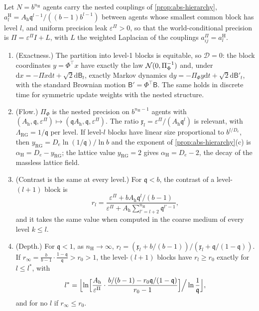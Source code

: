 \begin{theorem}\label{thm:ren-nested}
Let $N=b^{n_{\mathrm H}}$ agents carry the nested couplings of \cref{prop:abs-hierarchy}, $a^{\mathrm H}_l=A_{\mathrm h}\mathfrak q^{l-1}/((b-1)b^{l-1})$ between agents whose smallest common block has level $l$, and uniform precision leak $\varepsilon^\Pi>0$, so that the world-conditional precision is $\Pi=\varepsilon^\Pi I+L$, with $L$ the weighted Laplacian of the couplings $a^\Pi_{ij}=a^{\mathrm H}_l$.
\begin{enumerate}
\item[(a)] (Exactness.) The partition into level-1 blocks is equitable, so $\mathcal D=0$: the block coordinates $y=\Phi^\top x$ have exactly the law $\mathcal{N}(0,\Pi_\Phi^{-1})$ and, under $\mathrm dx=-\Pi x\mathrm dt+\sqrt2\mathrm d\mathsf B_t$, exactly Markov dynamics $\mathrm dy=-\Pi_\Phi y\mathrm dt+\sqrt2\mathrm d\mathsf B'_t$, with the standard Brownian motion $\mathsf B'=\Phi^\top\mathsf B$. The same holds in discrete time for symmetric update weights with the nested structure.
\item[(b)] (Flow.) $\Pi_\Phi$ is the nested precision on $b^{n_{\mathrm H}-1}$ agents with $(A_{\mathrm h},\mathfrak q,\varepsilon^\Pi)\mapsto(\mathfrak qA_{\mathrm h},\mathfrak q,\varepsilon^\Pi)$. The ratio $\mathfrak x_l=\varepsilon^\Pi/(A_{\mathrm h}\mathfrak q^l)$ is relevant, with $\Lambda_{\mathrm{RG}}=1/\mathfrak q$ per level. If level-$l$ blocks have linear size proportional to $b^{l/D_e}$, then $y_{\mathrm{RG}}=D_e\ln(1/\mathfrak q)/\ln b$ and the exponent of \cref{prop:abs-hierarchy}(c) is $\alpha_{\mathrm H}=D_e-y_{\mathrm{RG}}$; the lattice value $y_{\mathrm{RG}}=2$ gives $\alpha_{\mathrm H}=D_e-2$, the decay of the massless lattice field.
\item[(c)] (Contrast is the same at every level.) For $\mathfrak q<b$, the contrast of a level-$(l+1)$ block is
\begin{equation}\label{eq:ren-nested-contrast}
r_l=\frac{\varepsilon^\Pi+bA_{\mathrm h}\mathfrak q^l/(b-1)}{\varepsilon^\Pi+A_{\mathrm h}\sum_{l'=l+2}^{n_{\mathrm H}}\mathfrak q^{l'-1}},
\end{equation}
and it takes the same value when computed in the coarse medium of every level $k\le l$.
\item[(d)] (Depth.) For $\mathfrak q<1$, as $n_{\mathrm H}\to\infty$, $r_l=(\mathfrak x_l+b/(b-1))/(\mathfrak x_l+\mathfrak q/(1-\mathfrak q))$. If $r_\infty=\frac b{b-1}\cdot\frac{1-\mathfrak q}{\mathfrak q}>r_0>1$, the level-$(l+1)$ blocks have $r_l\ge r_0$ exactly for $l\le l^\ast$, with
\[
l^\ast=\Bigl\lfloor\ln\Bigl[\frac{A_{\mathrm h}}{\varepsilon^\Pi}\cdot\frac{b/(b-1)-r_0\mathfrak q/(1-\mathfrak q)}{r_0-1}\Bigr]\Big/\ln\frac1{\mathfrak q}\Bigr\rfloor,
\]
and for no $l$ if $r_\infty\le r_0$.
\end{enumerate}
\end{theorem}
